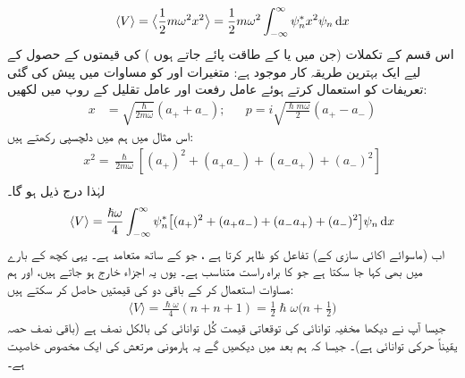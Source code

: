 \begin{align*}
\langle V \rangle =\big\langle\frac{1}{2}m\omega ^{2}x^{2}\big\rangle=\frac{1}{2}m\omega ^{2}\int_{-\infty}^{\infty}\psi_{n}^{*}x^{2}\psi_{n}\dif{x}
\end{align*}
اس قسم کے تکملات (جن میں   یا  کے طاقت پائے جاتے ہوں ) کی قیمتوں کے حصول کے لیے  ایک بہترین طریقہ کار موجود  ہے: متغیرات  اور  کو مساوات  میں پیش کی گئی تعریفات کو  استعمال کرتے ہوئے عامل رفعت اور عامل تقلیل کے روپ میں لکھیں:
\begin{align}
x&=\sqrt{\frac{\hslash}{2m\omega}}(a_++a_-); && p=i\sqrt{\frac{\hslash m \omega}{2}}(a_+-a_-)
\end{align}
اس مثال میں ہم  میں دلچسپی رکھتے ہیں:
\begin{align*}
x^{2}=\frac{\hslash}{2m\omega}[(a_{+})^{2}+(a_{+}a_{-})+(a_{-}a_{+})+(a_{-})^{2}] \\
\end{align*}
لہٰذا درج ذیل ہو گا۔
\begin{align*}
\langle V \rangle =\frac{\hslash\omega}{4}\int_{-\infty}^{\infty} \psi_{n}^{*}\big[(a_{+})^{2}+(a_{+}a_{-})+(a_{-}a_{+})+(a_{-})^{2}\big ]\psi_{n}\dif{x}
\end{align*}
اب (ماسوائے اکائی سازی کے)   تفاعل  کو ظاہر کرتا ہے ، جو  کے ساتھ   متعامد ہے۔ یہی کچھ  کے بارے میں بھی کہا جا سکتا ہے جو  کا براہ  راست متناسب ہے۔ یوں یہ اجزاء خارج ہو جاتے ہیں، اور ہم مساوات  استعمال کر کے باقی دو کی قیمتیں حاصل کر سکتے ہیں:
\begin{align*}
\langle V \rangle =\frac{\hslash\omega}{4}(n+n+1)=\frac{1}{2}\hslash\omega\big (n+\frac{1}{2} \big )
\end{align*}
جیسا آپ نے دیکھا مخفیہ توانائی کی توقعاتی قیمت کُل توانائی کی بالکل نصف ہے (باقی نصف حصہ یقیناً حرکی توانائی ہے)۔ جیسا کہ  ہم بعد میں دیکھیں گے یہ ہارمونی مرتعش کی ایک مخصوص خاصیت ہے۔

